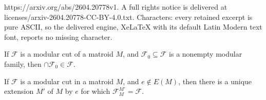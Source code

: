 \documentclass[10pt,a4paper]{amsart}
\newcommand{\cF}{\mathcal{F}}
\begin{document}
https://arxiv.org/abs/2604.20778v1. A full rights notice is delivered at licenses/arxiv-2604.20778-CC-BY-4.0.txt. Characters: every retained excerpt is pure ASCII, so the delivered engine, XeLaTeX with its default Latin Modern text font, reports no missing character.
\begin{lemma}\label{modcutinter}
  If $\cF$ is a modular cut of a matroid $M$, and $\cF_0 \subseteq \cF$ is a nonempty 
  modular family, then $\cap \cF_0 \in \cF$. 
\end{lemma}

\begin{theorem}\label{modcutextension}
  If $\cF$ is a modular cut in a matroid $M$, and $e \notin E(M)$,
  then there is a unique extension $M'$ of $M$ by $e$ for which $\cF_M^{M'} = \cF$. 
\end{theorem}
\end{document}
